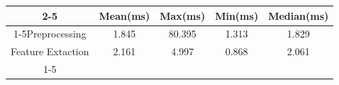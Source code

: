 \documentclass{standalone}
\begin{document}
 
 \begin{tabular}{|c |c |c |c |c |}
\cline{2-5}\cline{2-5} \multicolumn{1}{c |}{ } & Mean(ms) & Max(ms) & Min(ms) & Median(ms)\\ 
\cline{1-5}Preprocessing & 1.845 & 80.395 & 1.313 & 1.829\\ 
 \hhline{|=|=|=|=|=|}Feature Extaction & 2.161 & 4.997 & 0.868 & 2.061\\ 
 \cline{1-5}\hline \end{tabular}
 
\end{document}
